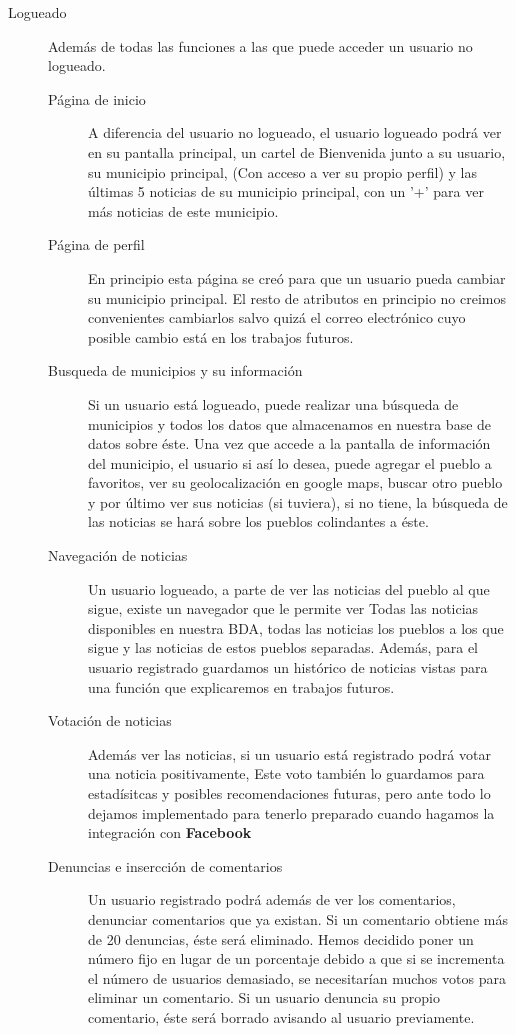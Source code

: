 \begin{description}
\item[Logueado]
	Además de todas las funciones a las que puede acceder un usuario no logueado.
	\begin{description}
		\item[Página de inicio]
			A diferencia del usuario no logueado, el usuario logueado podrá ver en su pantalla principal, un cartel de Bienvenida junto a su usuario, su municipio principal, (Con acceso a ver su propio perfil) y las últimas 5 noticias de su municipio principal, con un '+' para ver más noticias de este municipio.
		\item[Página de perfil]
			En principio esta página se creó para que un usuario pueda cambiar su municipio principal. El resto de atributos en principio no creimos convenientes cambiarlos salvo quizá el correo electrónico cuyo posible cambio está en los trabajos futuros.
		\item[Busqueda de municipios y su información]
			Si un usuario está logueado, puede realizar una búsqueda de municipios y todos los datos que almacenamos en nuestra base de datos sobre éste. Una vez que accede a la pantalla de información del municipio, el usuario si así lo desea, puede agregar el pueblo a favoritos, ver su geolocalización en google maps, buscar otro pueblo y por último ver sus noticias (si tuviera), si no tiene, la búsqueda de las noticias se hará sobre los pueblos colindantes a éste. 
		\item[Navegación de noticias]
			Un usuario logueado, a parte de ver las noticias del pueblo al que sigue, existe un navegador que le permite ver Todas las noticias disponibles en nuestra BDA, todas las noticias los pueblos a los que sigue y las noticias de estos pueblos separadas. Además, para el usuario registrado guardamos un histórico de noticias vistas para una función que explicaremos en trabajos futuros.

		\item[Votación de noticias]
			Además ver las noticias, si un usuario está registrado podrá votar una noticia positivamente, Este voto también lo guardamos para estadísitcas y posibles recomendaciones futuras, pero ante todo lo dejamos implementado para tenerlo preparado cuando hagamos la integración con \textbf{Facebook}
		\item[Denuncias e insercción de comentarios]
			Un usuario registrado podrá además de ver los comentarios, denunciar comentarios que ya existan. Si un comentario obtiene más de 20 denuncias, éste será eliminado. Hemos decidido poner un número fijo en lugar de un porcentaje debido a que si se incrementa el número de usuarios demasiado, se necesitarían muchos votos para eliminar un comentario. Si un usuario denuncia su propio comentario, éste será borrado avisando al usuario previamente.


\end{description}
\end{description}
